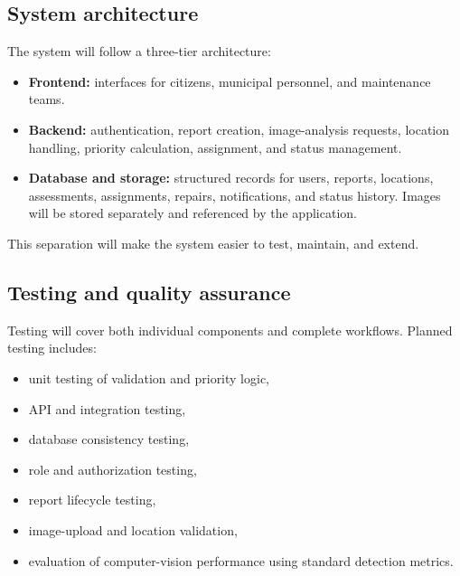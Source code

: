 \documentclass[11pt,a4paper]{article}
\begin{document}
\subsection{System architecture}

The system will follow a three-tier architecture:

\begin{itemize}[leftmargin=0.6cm]

    \item \textbf{Frontend:} interfaces for citizens, municipal personnel, and maintenance teams.

    \item \textbf{Backend:} authentication, report creation, image-analysis requests, location handling, priority calculation, assignment, and status management.

    \item \textbf{Database and storage:} structured records for users, reports, locations, assessments, assignments, repairs, notifications, and status history. Images will be stored separately and referenced by the application.

\end{itemize}

This separation will make the system easier to test, maintain, and extend.

\subsection{Testing and quality assurance}

Testing will cover both individual components and complete workflows. Planned testing includes:

\begin{itemize}[leftmargin=0.6cm]

    \item unit testing of validation and priority logic,
    \item API and integration testing,
    \item database consistency testing,
    \item role and authorization testing,
    \item report lifecycle testing,
    \item image-upload and location validation,
    \item evaluation of computer-vision performance using standard detection metrics.

\end{itemize}
\end{document}
